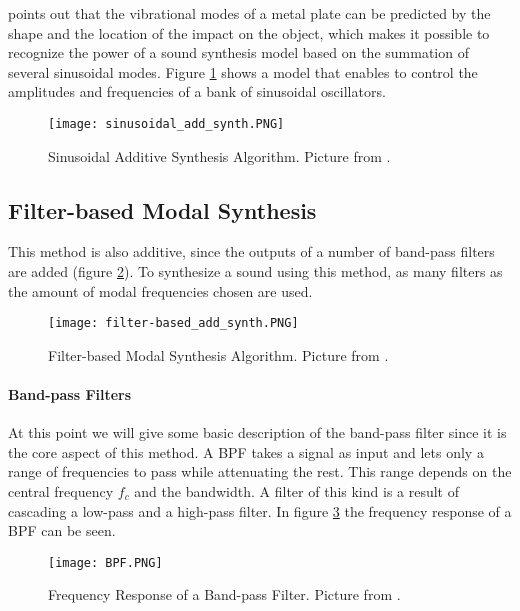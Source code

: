 \cite{Cook:2002:RSS:515316} points out that the vibrational modes of a  metal plate can be predicted by the shape and the location of the impact on the object, which makes it possible to recognize the power of a sound synthesis model based on the summation of several sinusoidal modes. Figure \ref{fig:sin_add_synth} shows a model that enables to control the amplitudes and frequencies of a bank of sinusoidal oscillators.

\begin{figure}[H]
  \centering
    \texttt{[image: sinusoidal\_add\_synth.PNG]}
      \caption{Sinusoidal Additive Synthesis Algorithm. Picture from \cite{Cook:2002:RSS:515316}.}
      \label{fig:sin_add_synth}
\end{figure}

\subsection{Filter-based Modal Synthesis}\label{sec:add_synth}

This method is also additive, since the outputs of a number of band-pass filters are added (figure \ref{fig:filter_synth}). To synthesize a sound using this method, as many filters as the amount of modal frequencies chosen are used.

\begin{figure}[H]
  \centering
    \texttt{[image: filter-based\_add\_synth.PNG]}
      \caption{Filter-based Modal Synthesis Algorithm. Picture from \cite{Cook:2002:RSS:515316}.}
      \label{fig:filter_synth}
\end{figure}

\paragraph{Band-pass Filters}\label{par:bpf}
\hfill \break

At this point we will give some basic description of the band-pass filter since it is the core aspect of this method. A \gls{BPF} takes a signal as input and lets only a range of frequencies to pass while attenuating the rest. This range depends on the central frequency $f_c$ and the bandwidth. A filter of this kind is a result of cascading a low-pass and a high-pass filter.
In figure \ref{fig:resp_bpf} the frequency response of a \gls{BPF} can be seen. 

\begin{figure}[H]
  \centering
    \texttt{[image: BPF.PNG]}
      \caption{Frequency Response of a Band-pass Filter. Picture from \cite{bib:bpf}.}
      \label{fig:resp_bpf}
\end{figure}

